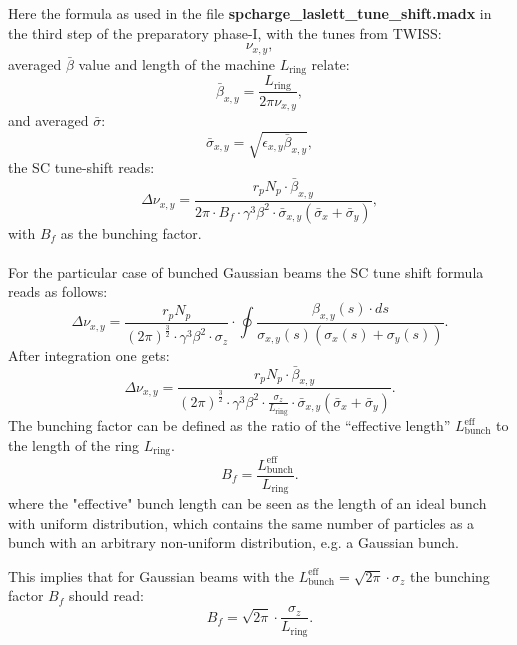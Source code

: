 Here the formula as used in the file {\bf
  spcharge\_laslett\_tune\_shift.madx} in the third step of the
preparatory phase-I, with the tunes from TWISS:
\begin{equation}
\nu_{x, y},
\end{equation}
averaged $\bar{\beta}$ value and length of the machine
$L_{\textrm{ring}}$ relate:
\begin{equation}
\bar{\beta}_{x, y} = \frac{L_{\textrm{ring}}}{2\pi\nu_{x, y}},
\end{equation}
and averaged $\bar{\sigma}$:
\begin{equation}
\bar{\sigma}_{x, y} = \sqrt{\epsilon_{x, y}\bar{\beta}_{x, y}},
\end{equation}
the SC tune-shift reads:
\begin{equation}\label{LASLETT}
\Delta\nu_{x, y} = \frac{r_pN_p \cdot \bar{\beta}_{x, y}}{2\pi\cdot
  B_f \cdot \gamma^3 \beta^2 \cdot \bar{\sigma}_{x, y}(\bar{\sigma}_x
  + \bar{\sigma}_y)},
\end{equation}
with $B_f$ as the bunching factor.\\ \mbox{ }\\ For the particular
case of bunched Gaussian beams the SC tune shift formula reads as
follows:
\begin{equation}\label{LASLETT-BUNCH}
\Delta\nu_{x, y} = \frac{r_pN_p}{(2\pi)^{\frac{3}{2}} \cdot \gamma^3
  \beta^2 \cdot \sigma_z}\cdot \oint{\frac{\beta_{x, y}(s) \cdot
    ds}{\sigma_{x, y}(s)(\sigma_x(s) + \sigma_y(s))}}.
\end{equation}
After integration one gets:
\begin{equation}
\Delta\nu_{x, y} = \frac{r_pN_p \cdot \bar{\beta}_{x,
    y}}{(2\pi)^{\frac{3}{2}} \cdot \gamma^3 \beta^2 \cdot
  \frac{\sigma_z}{L_{\textrm{ring}}} \cdot \bar{\sigma}_{x,
    y}(\bar{\sigma}_x + \bar{\sigma}_y)}.
\end{equation}
The bunching factor can be defined as the ratio of the ``effective
length'' $L^{\textrm{eff}}_{\textrm{bunch}}$ to the length of the ring
$L_{\textrm{ring}}$.
\begin{equation}
B_f = \frac{L^{\textrm{eff}}_{\textrm{bunch}}}{L_{\textrm{ring}}}.
\end{equation}
where the "effective" bunch length can be seen as the length of an
ideal bunch with uniform distribution, which contains the same number
of particles as a bunch with an arbitrary non-uniform distribution,
e.g. a Gaussian bunch.

This implies that for Gaussian beams with the
$L^{\textrm{eff}}_{\textrm{bunch}} = \sqrt{2\pi} \cdot \sigma_z$ the
bunching factor $B_f$ should read:
\begin{equation}\label{BF}
B_f = \sqrt{2\pi} \cdot \frac{\sigma_z}{L_{\textrm{ring}}}.
\end{equation}

